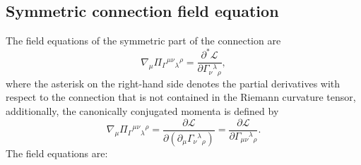 \documentclass{article}
\begin{document}
\subsection{Symmetric connection field equation}

The field equations of the symmetric part of the connection are
\begin{equation}
    \nabla_\mu \Pi_{\Gamma}{}^{\mu\nu}{}_{\lambda}{}^{\rho}  = \frac{\partial^* \mathcal{L}}{\partial \Gamma_{\nu}{}^{\lambda}{}_{\rho}},
\end{equation}
where the asterisk on the right-hand side denotes the partial derivatives with respect to the connection that is not
contained in the Riemann curvature tensor, additionally, the canonically conjugated momenta is defined by
\begin{equation}
    \nabla_\mu \Pi_{\Gamma}{}^{\mu\nu}{}_{\lambda}{}^{\rho}  
    = \frac{\partial \mathcal{L}}{\partial \left(\partial_\mu \Gamma_{\nu}{}^{\lambda}{}_{\rho}\right)} 
    = \frac{\partial \mathcal{L}}{\partial  \Gamma_{\mu\nu}{}^{\lambda}{}_{\rho}}.
\end{equation}
The field equations are:
\end{document}
